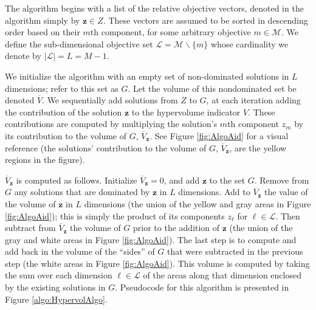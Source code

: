 The algorithm begins with a list of the relative objective vectors, denoted in the algorithm simply by $\mathbf{z} \in Z$. These vectors are assumed to be sorted in descending order based on their $m$th component, for some arbitrary objective $m \in \mathcal{M}$. We define the sub-dimensional objective set $\mathcal{L} = \mathcal{M} \backslash \{m\}$ whose cardinality we denote by $|\mathcal{L}| = L = M - 1$.

We initialize the algorithm with an empty set of non-dominated solutions in $L$ dimensions; refer to this set as $G$. Let the volume of this nondominated set be denoted $\overbar{V}$. We sequentially add solutions from $Z$ to $G$, at each iteration adding the contribution of the solution $\mathbf{z}$ to the hypervolume indicator $V$. These contributions are computed by multiplying the solution's $m$th component $z_m$ by its contribution to the volume of $G$, $\overbar{V}_\mathbf{z}$. See Figure \ref{fig:AlgoAid} for a visual reference (the solutions' contribution to the volume of $G$, $\overbar{V}_\mathbf{z}$, are the yellow regions in the figure).

$\overbar{V}_\mathbf{z}$ is computed as follows. Initialize $\overbar{V}_\mathbf{z} = 0$, and add $\mathbf{z}$ to the set $G$. Remove from $G$ any solutions that are dominated by $\mathbf{z}$ in $L$ dimensions. Add to $\overbar{V}_\mathbf{z}$ the value of the volume of $\mathbf{z}$ in $L$ dimensions (the union of the yellow and gray areas in Figure \ref{fig:AlgoAid}); this is simply the product of its components $z_\ell$ for $\ell \in \mathcal{L}$. Then subtract from $\overbar{V}_\mathbf{z}$ the volume of $G$ prior to the addition of $\mathbf{z}$ (the union of the gray and white areas in Figure \ref{fig:AlgoAid}). The last step is to compute and add back in the volume of the ``sides'' of $G$ that were subtracted in the previous step (the white areas in Figure \ref{fig:AlgoAid}). This volume is computed by taking the sum over each dimension $\ell \in \mathcal{L}$ of the areas along that dimension enclosed by the existing solutions in $G$. Pseudocode for this algorithm is presented in Figure \ref{algo:HypervolAlgo}.

